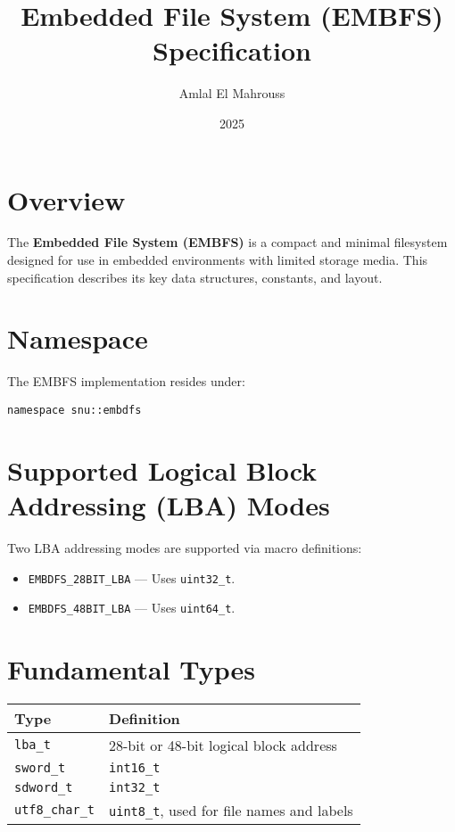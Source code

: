 \documentclass{article}
\title{Embedded File System (EMBFS) Specification}
\author{Amlal El Mahrouss}
\date{2025}
\begin{document}
\maketitle

\section{Overview}
The \textbf{Embedded File System (EMBFS)} is a compact and minimal filesystem designed for use in embedded environments with limited storage media. This specification describes its key data structures, constants, and layout.

\section{Namespace}
The EMBFS implementation resides under:
\begin{lstlisting}
namespace snu::embdfs
\end{lstlisting}

\section{Supported Logical Block Addressing (LBA) Modes}
Two LBA addressing modes are supported via macro definitions:
\begin{itemize}
    \item \texttt{EMBDFS\_28BIT\_LBA} — Uses \texttt{uint32\_t}.
    \item \texttt{EMBDFS\_48BIT\_LBA} — Uses \texttt{uint64\_t}.
\end{itemize}

\section{Fundamental Types}
\begin{longtable}{|l|l|}
\hline
\textbf{Type} & \textbf{Definition} \\
\hline
\texttt{lba\_t} & 28-bit or 48-bit logical block address \\
\texttt{sword\_t} & \texttt{int16\_t} \\
\texttt{sdword\_t} & \texttt{int32\_t} \\
\texttt{utf8\_char\_t} & \texttt{uint8\_t}, used for file names and labels \\
\hline
\end{longtable}
\end{document}
